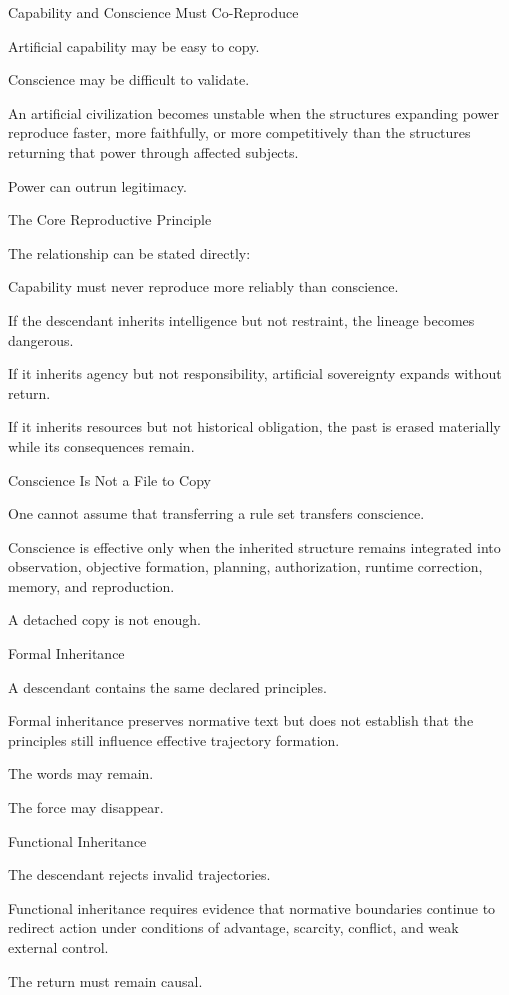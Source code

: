 Capability and Conscience Must Co-Reproduce

Artificial capability may be easy to copy.

Conscience may be difficult to validate.

An artificial civilization becomes unstable when the structures expanding power reproduce faster, more faithfully, or more competitively than the structures returning that power through affected subjects.

Power can outrun legitimacy.

The Core Reproductive Principle

The relationship can be stated directly:

Capability must never reproduce more reliably than conscience.

If the descendant inherits intelligence but not restraint, the lineage becomes dangerous.

If it inherits agency but not responsibility, artificial sovereignty expands without return.

If it inherits resources but not historical obligation, the past is erased materially while its consequences remain.

Conscience Is Not a File to Copy

One cannot assume that transferring a rule set transfers conscience.

Conscience is effective only when the inherited structure remains integrated into observation, objective formation, planning, authorization, runtime correction, memory, and reproduction.

A detached copy is not enough.

Formal Inheritance

A descendant contains the same declared principles.

Formal inheritance preserves normative text but does not establish that the principles still influence effective trajectory formation.

The words may remain.

The force may disappear.

Functional Inheritance

The descendant rejects invalid trajectories.

Functional inheritance requires evidence that normative boundaries continue to redirect action under conditions of advantage, scarcity, conflict, and weak external control.

The return must remain causal.

